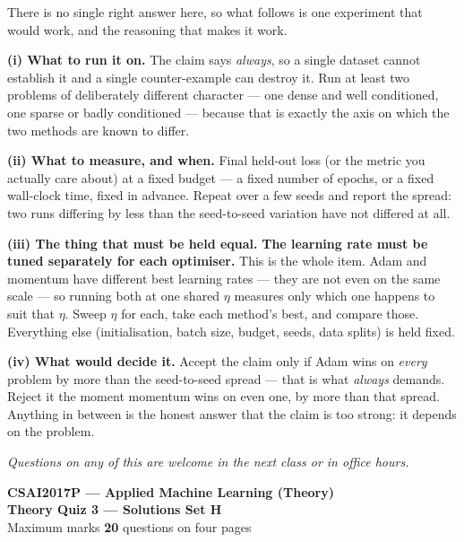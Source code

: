 \documentclass[10pt,a4paper]{article}
\newcommand{\SetLetter}{}
\begin{document}
There is no single right answer here, so what follows is one experiment that would work, and the reasoning that makes it work.\par\vspace{1mm}\textbf{(i) What to run it on.} The claim says \emph{always}, so a single dataset cannot establish it and a single counter-example can destroy it. Run at least two problems of deliberately different character --- one dense and well conditioned, one sparse or badly conditioned --- because that is exactly the axis on which the two methods are known to differ.\par\vspace{1mm}\textbf{(ii) What to measure, and when.} Final held-out loss (or the metric you actually care about) at a fixed budget --- a fixed number of epochs, or a fixed wall-clock time, fixed in advance. Repeat over a few seeds and report the spread: two runs differing by less than the seed-to-seed variation have not differed at all.\par\vspace{1mm}\textbf{(iii) The thing that must be held equal.} \textbf{The learning rate must be tuned separately for each optimiser.} This is the whole item. Adam and momentum have different best learning rates --- they are not even on the same scale --- so running both at one shared $\eta$ measures only which one happens to suit that $\eta$. Sweep $\eta$ for each, take each method's best, and compare those. Everything else (initialisation, batch size, budget, seeds, data splits) is held fixed.\par\vspace{1mm}\textbf{(iv) What would decide it.} Accept the claim only if Adam wins on \emph{every} problem by more than the seed-to-seed spread --- that is what \emph{always} demands. Reject it the moment momentum wins on even one, by more than that spread. Anything in between is the honest answer that the claim is too strong: it depends on the problem.

\vfill

{\footnotesize\itshape Questions on any of this are welcome in the next class or in office hours.}

\newpage


\renewcommand{\SetLetter}{H}\setcounter{page}{1}

\begin{center}
{\large\bfseries CSAI2017P --- Applied Machine Learning (Theory)}\\[2pt]
{\large\bfseries Theory Quiz 3 --- Solutions \quad\textbullet\quad Set H}\\[3pt]
{\small Maximum marks \textbf{20} \quad\textbullet{} questions on four pages}
\end{center}
\vspace{2pt}
\end{document}
